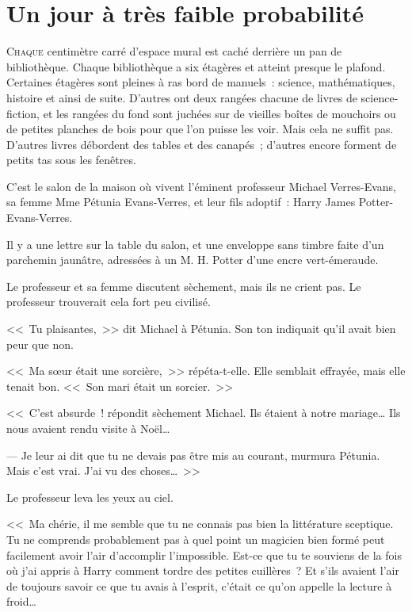 \chapter{Un jour à très faible probabilité}

\lettrine{C}{haque} centimètre carré d'espace mural est caché derrière un pan de bibliothèque. Chaque bibliothèque a six étagères et atteint presque le
plafond. Certaines étagères sont pleines à ras bord de manuels~: science, mathématiques, histoire et ainsi de suite. D'autres ont deux rangées chacune de livres de science-fiction, et les rangées du fond sont juchées sur de vieilles boîtes de mouchoirs\footnotemark{} ou de petites planches de bois pour que l'on puisse les voir. Mais cela ne suffit pas. D'autres livres débordent des tables et des canapés~; d'autres encore forment de petits tas sous les fenêtres.

C'est le salon de la maison où vivent l'éminent professeur Michael Verres-Evans, sa femme Mme Pétunia Evans-Verres, et leur fils adoptif~: Harry James Potter-Evans-Verres.

Il y a une lettre sur la table du salon, et une enveloppe sans timbre faite d'un parchemin jaunâtre, adressées à un M. H. Potter d'une encre vert-émeraude.

Le professeur et sa femme discutent sèchement, mais ils ne crient pas. Le professeur trouverait cela fort peu civilisé.

<<~Tu plaisantes,~>> dit Michael à Pétunia. Son ton indiquait qu'il avait bien peur que non.

<<~Ma sœur était une sorcière,~>> répéta-t-elle. Elle semblait effrayée, mais elle tenait bon. <<~Son mari était un sorcier.~>>

<<~C'est absurde~! répondit sèchement Michael. Ils étaient à notre mariage… Ils nous avaient rendu visite à Noël…

--- Je leur ai dit que tu ne devais pas être mis au courant, murmura Pétunia. Mais c'est vrai. J'ai vu des choses…~>>

Le professeur leva les yeux au ciel.

<<~Ma chérie, il me semble que tu ne connais pas bien la littérature sceptique. Tu ne comprends probablement pas à quel point un magicien bien formé peut facilement avoir l'air d'accomplir l'impossible. Est-ce que tu te souviens de la fois où j'ai appris à Harry comment tordre des petites cuillères~? Et s'ils avaient l'air de toujours savoir ce que tu avais à l'esprit, c'était ce qu'on appelle la lecture à froid…

